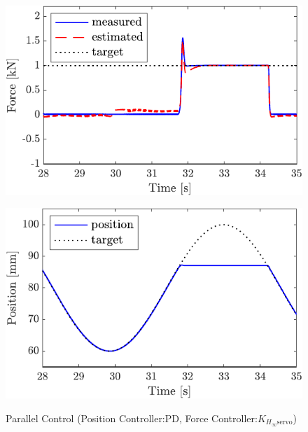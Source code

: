 \begin{figure}[t]
    \begin{minipage}{\minipageratio\hsize}
    \centering
        \includegraphics[keepaspectratio, scale = \minifigscale]{contents/IntegrationControl/figure/SECASQ/crop-FBsw_JFPS4_force.pdf}
        \label{fig5:crop-FBsw_JFPS4_force}
    \end{minipage}
    \begin{minipage}{\minipageratio\hsize}
    \centering
        \includegraphics[keepaspectratio, scale = \minifigscale]
        {contents/IntegrationControl/figure/SECASQ/crop-FBsw_JFPS4_pos.pdf}
        \label{fig5:crop-FBsw_JFPS4_pos}
    \end{minipage}
    \caption{Parallel Control (Position Controller:PD, Force Controller:$K_{H_\infty\mathrm{servo}}$)}   
    \label{fig5:crop-FBsw_JFPS4}
\end{figure}

